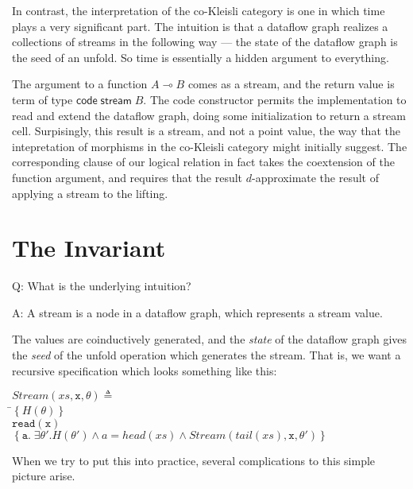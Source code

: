 \documentclass[preprint]{sigplanconf}
\newcommand{\setof}[1]{\left\{{#1}\right\}}
\newcommand{\term}[1]{\ensuremath{\mathtt{{#1}}}}
\newcommand{\comp}[1]{\mathsf{code}\;{#1}}
\newcommand{\streamtype}[1]{\mathsf{stream}\;{#1}}
\newcommand{\lolli}{\multimap}
\newcommand{\head}[1]{\mathit{head}(#1)}
\newcommand{\tail}[1]{\mathit{tail}(#1)}
\begin{document}
In contrast, the interpretation of the co-Kleisli category is one in
which time plays a very significant part. The intuition is that a
dataflow graph realizes a collections of streams in the following way
--- the state of the dataflow graph is the seed of an unfold.  So time
is essentially a hidden argument to everything.

The argument to a function $A \lolli B$ comes as a stream, and the
return value is term of type $\comp{\streamtype{B}}$. The code
constructor permits the implementation to read and extend the dataflow
graph, doing some initialization to return a stream cell. Surpisingly,
this result is a stream, and not a point value, the way that the
intepretation of morphisms in the co-Kleisli category might initially
suggest. The corresponding clause of our logical relation in fact
takes the coextension of the function argument, and requires that the
result $d$-approximate the result of applying a stream to the lifting. 

\section{The Invariant}

Q: What is the underlying intuition?

\noindent A: A stream is a node in a dataflow graph, which represents a stream value. 

The values are coinductively generated, and the \emph{state} of the
dataflow graph gives the \emph{seed} of the unfold operation which
generates the stream. That is, we want a recursive specification 
which looks something like this: 

\begin{tabbing}
$\mathit{Stream}(xs, \term{x}, \theta) \triangleq$  \\
\;\;\=$\setof{H(\theta)}$  \\
    \>\term{read(x)} \\
    \>$\setof{\term{a}.\;\exists \theta'. H(\theta') \land a = \head{xs} \land 
                           \mathit{Stream}(\tail{xs},\term{x}, \theta')}$ \\
\end{tabbing}

When we try to put this into practice, several complications to this
simple picture arise.
\end{document}
